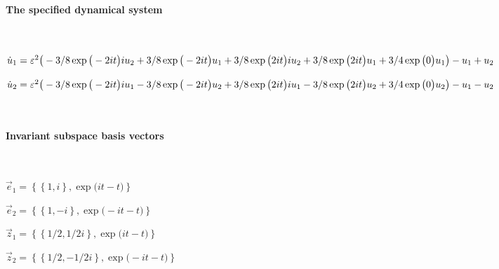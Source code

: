 
\(\)
\paragraph{The specified dynamical system}
\(
\)\par

\(\dot u_{1}=\varepsilon^{2} \big(-3/8 \exp \big(-2 i t\big) i u\sb2+3/8 \exp 
\big(-2 i t\big) u\sb1+3/8 \exp \big(2 i t\big) i u\sb2+3/8 \exp \big(2 
i t\big) u\sb1+3/4 \exp \big(0\big) u\sb1\big)-u\sb1+u\sb2
\)\par

\(\dot u_{2}=\varepsilon^{2} \big(-3/8 \exp \big(-2 i t\big) i u\sb1-3/8 \exp 
\big(-2 i t\big) u\sb2+3/8 \exp \big(2 i t\big) i u\sb1-3/8 \exp \big(2 
i t\big) u\sb2+3/4 \exp \big(0\big) u\sb2\big)-u\sb1-u\sb2
\)\par

\(\)
\paragraph{Invariant subspace basis vectors}
\(
\)\par

\(\vec e_{1}=\left\{
\left\{
1 , i
\right\} , \exp \big(i t-t\big)
\right\}
\)\par

\(\vec e_{2}=\left\{
\left\{
1 , -i
\right\} , \exp \big(-i t-t\big)
\right\}
\)\par

\(\vec z_{1}=\left\{
\left\{
1/2 , 1/2 i
\right\} , \exp \big(i t-t\big)
\right\}
\)\par

\(\vec z_{2}=\left\{
\left\{
1/2 , -1/2 i
\right\} , \exp \big(-i t-t\big)
\right\}
\)\par
